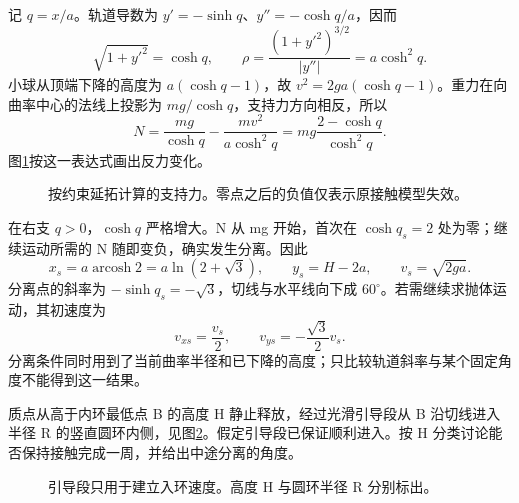 \begin{solution}
记 $q=x/a$。轨道导数为 $y'=-\sinh q$、$y''=-\cosh q/a$，因而
\[
\sqrt{1+y'^2}=\cosh q,\qquad
\rho=\frac{(1+y'^2)^{3/2}}{|y''|}=a\cosh^2q.
\]
小球从顶端下降的高度为 $a(\cosh q-1)$，故 $v^2=2ga(\cosh q-1)$。重力在向曲率中心的法线上投影为 $mg/\cosh q$，支持力方向相反，所以
\[
N=\frac{mg}{\cosh q}-\frac{mv^2}{a\cosh^2q}
=mg\frac{2-\cosh q}{\cosh^2q}.
\]
图\ref{sup2:fig:d2-h3-s}按这一表达式画出反力变化。

\begin{figure}[H]\centering
{}
\caption{按约束延拓计算的支持力。零点之后的负值仅表示原接触模型失效。}\label{sup2:fig:d2-h3-s}
\end{figure}

在右支 $q>0$，$\cosh q$ 严格增大。N 从 mg 开始，首次在 $\cosh q_s=2$ 处为零；继续运动所需的 N 随即变负，确实发生分离。因此
\[
x_s=a\operatorname{arcosh}2=a\ln(2+\sqrt3),\qquad
y_s=H-2a,\qquad v_s=\sqrt{2ga}.
\]
分离点的斜率为 $-\sinh q_s=-\sqrt3$，切线与水平线向下成 $60^\circ$。若需继续求抛体运动，其初速度为
\[
v_{xs}=\frac{v_s}{2},\qquad
v_{ys}=-\frac{\sqrt3}{2}v_s.
\]
分离条件同时用到了当前曲率半径和已下降的高度；只比较轨道斜率与某个固定角度不能得到这一结果。

\end{solution}


\begin{exercise}[由高度控制的内环通行]\label{sup2:problem-exercise-4}\label{sup2:exercise:d2-h4}

质点从高于内环最低点 B 的高度 H 静止释放，经过光滑引导段从 B 沿切线进入半径 R 的竖直圆环内侧，见图\ref{sup2:fig:d2-h4-q}。假定引导段已保证顺利进入。按 H 分类讨论能否保持接触完成一周，并给出中途分离的角度。

\end{exercise}
\begin{figure}[H]\centering
{}
\caption{引导段只用于建立入环速度。高度 H 与圆环半径 R 分别标出。}\label{sup2:fig:d2-h4-q}
\end{figure}
\par\medskip

